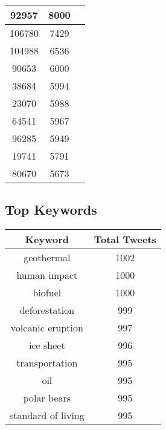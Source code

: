 \documentclass{article}\usepackage[T1]{fontenc}
\begin{document}
\begin{tabular}{|c|c|c|}
 \hline
92957 & 8000\\ 
 \hline
106780 & 7429\\ 
 \hline
104988 & 6536\\ 
 \hline
90653 & 6000\\ 
 \hline
38684 & 5994\\ 
 \hline
23070 & 5988\\ 
 \hline
64541 & 5967\\ 
 \hline
96285 & 5949\\ 
 \hline
19741 & 5791\\ 
 \hline
80670 & 5673\\ 
 \hline
\end{tabular}\subsection*{Top Keywords}\begin{tabular}{|c|c|}         \hline         Keyword & Total Tweets \\ 
 \hline
geothermal & 1002\\ 
 \hline
human impact & 1000\\ 
 \hline
biofuel & 1000\\ 
 \hline
deforestation & 999\\ 
 \hline
volcanic eruption & 997\\ 
 \hline
ice sheet & 996\\ 
 \hline
transportation & 995\\ 
 \hline
oil & 995\\ 
 \hline
polar bears & 995\\ 
 \hline
standard of living & 995\\ 
 \hline
\end{tabular}
\end{document}
